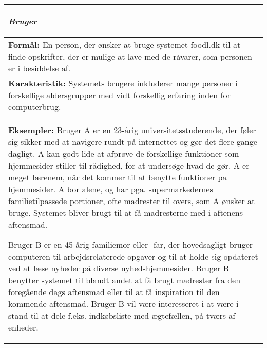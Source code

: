 \begin{tabular}{p{\textwidth}}
    \hline
    \begin{center} \textbf{\textit{Bruger}} \end{center} \\ \hline
    \textbf{Formål:} En person, der ønsker at bruge systemet foodl.dk til at finde opskrifter, der er mulige at lave med de råvarer, som personen er i besiddelse af. \\
    \textbf{Karakteristik:} Systemets brugere inkluderer mange personer i forskellige aldersgrupper med vidt forskellig erfaring inden for computerbrug. \\
    \textbf{Eksempler:} Bruger A er en 23-årig universitetsstuderende, der føler sig sikker med at navigere rundt på internettet og gør det flere gange dagligt. A kan godt lide at afprøve de forskellige funktioner som hjemmesider stiller til rådighed, for at undersøge hvad de gør. A er meget lærenem, når det kommer til at benytte funktioner på hjemmesider. A bor alene, og har pga. supermarkedernes familietilpassede portioner, ofte madrester til overs, som A ønsker at bruge. Systemet bliver brugt til at få madresterne med i aftenens aftensmad.
 
Bruger B er en 45-årig familiemor eller -far, der hovedsagligt bruger computeren til arbejdsrelaterede opgaver og til at holde sig opdateret ved at læse nyheder på diverse nyhedshjemmesider. Bruger B benytter systemet til blandt andet at få brugt madrester fra den foregående dags aftensmad eller til at få inspiration til den kommende aftensmad. Bruger B vil være interesseret i at være i stand til at dele f.eks. indkøbsliste med ægtefællen, på tværs af enheder. \\ \hline 
\end{tabular}
